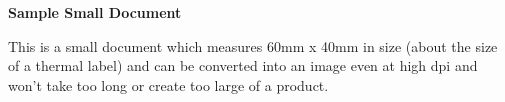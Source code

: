 \documentclass[14pt]{article}
\begin{document}
    \sffamily
    \noindent
    \textbf{Sample Small Document}

    \noindent
    This is a small document which measures 60mm x 40mm in size (about the size of a thermal label) and can be converted into an image even at high dpi and won't take too long or create too large of a product.
\end{document}

